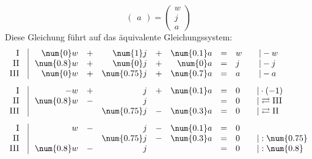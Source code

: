 \begin{exercise}
\begin{enumerate}[a)]
\begin{equation*}
\begin{pmatrix}
                a
              \end{pmatrix}
              =
              \begin{pmatrix}
                w \\
                j \\
                a
              \end{pmatrix}
            \end{equation*}
            Diese Gleichung führt auf das
            äquivalente Gleichungssystem:
            \begingroup
              \renewcommand{\arraycolsep}{2pt}%
              \begin{alignat*}{1}
                &
                \begin{array}{r|rcrcrcll}
                  \text{I}\;\;&\;   \num{0}w & + &    \num{1}j & + & \num{0.1}a & = & w & \quad|-w \\
                 \text{II}\;\;&\; \num{0.8}w & + &    \num{0}j & + &   \num{0}a & = & j & \quad|-j \\
                \text{III}\;\;&\;   \num{0}w & + & \num{0.75}j & + & \num{0.7}a & = & a & \quad|-a
                \end{array}
                \\[1ex] &
                \begin{array}{r|rcrcrcll}
                  \text{I}\;\;&\;         -w & + &           j & + & \num{0.1}a & = & 0 & \quad|\cdot(-1)                  \\
                 \text{II}\;\;&\; \num{0.8}w & - &           j &   &            & = & 0 & \quad|\rightleftarrows\text{III} \\
                \text{III}\;\;&\;            &   & \num{0.75}j & - & \num{0.3}a & = & 0 & \quad|\rightleftarrows\text{II}
                \end{array}
                \\[1ex] &
                \begin{array}{r|rcrcrcll}
                  \text{I}\;\;&\;          w & - &           j & - & \num{0.1}a & = & 0 & \quad\relax       \\
                 \text{II}\;\;&\;            &   & \num{0.75}j & - & \num{0.3}a & = & 0 & \quad|:\num{0.75} \\
                \text{III}\;\;&\; \num{0.8}w & - &           j &   &            & = & 0 & \quad|:\num{0.8}
                \end{array}
                \\[1ex] &
                \begin{array}{r|rcrcrcll}

\end{array}
\end{alignat*}
\end{enumerate}
\end{exercise}
